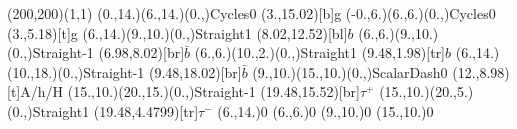 \documentclass[12pt]{article}
\begin{document}
 
 \thispagestyle{empty}
	
 \begin{feynartspicture}(200,200)(1,1) 
 \FADiagram{} 
\FAProp(0.,14.)(6.,14.)(0.,){Cycles}{0}
\FALabel(3.,15.02)[b]{g}
\FAProp(-0.,6.)(6.,6.)(0.,){Cycles}{0}
\FALabel(3.,5.18)[t]{g}
\FAProp(6.,14.)(9.,10.)(0.,){Straight}{1}
\FALabel(8.02,12.52)[bl]{$b$}
\FAProp(6.,6.)(9.,10.)(0.,){Straight}{-1}
\FALabel(6.98,8.02)[br]{$\bar{b}$}
\FAProp(6.,6.)(10.,2.)(0.,){Straight}{1}
\FALabel(9.48,1.98)[tr]{$b$}
\FAProp(6.,14.)(10.,18.)(0.,){Straight}{-1}
\FALabel(9.48,18.02)[br]{$\bar{b}$}
\FAProp(9.,10.)(15.,10.)(0.,){ScalarDash}{0}
\FALabel(12.,8.98)[t]{A/h/H}
\FAProp(15.,10.)(20.,15.)(0.,){Straight}{-1}
\FALabel(19.48,15.52)[br]{$\tau^+$}
\FAProp(15.,10.)(20.,5.)(0.,){Straight}{1}
\FALabel(19.48,4.4799)[tr]{$\tau^-$}
\FAVert(6.,14.){0}
\FAVert(6.,6.){0}
\FAVert(9.,10.){0}
\FAVert(15.,10.){0}
	
 
 \end{feynartspicture} 
 
\end{document}
